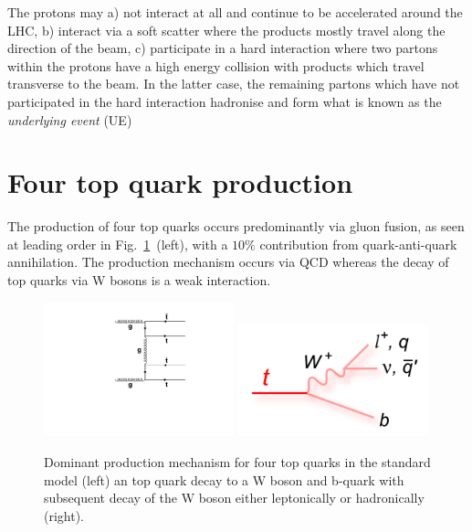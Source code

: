 The protons may a) not interact at all and continue to be accelerated around the LHC, b) interact via a soft scatter where the products mostly travel along the direction of the beam, c) participate in a hard interaction where two partons within the protons have a high energy collision with products which travel transverse to the beam. In the latter case, the remaining partons which have not participated in the hard interaction hadronise and form what is known as the \emph{underlying event} (UE)


\section{Four top quark production}

The production of four top quarks occurs predominantly via gluon fusion, as seen at leading order in Fig.~\ref{fig:ttttAtLO}~(left), with a $10\%$ contribution from quark-anti-quark annihilation. The production mechanism occurs via QCD whereas the decay of top quarks via W bosons is a weak interaction. 

\begin{figure}[ht!]
\begin{center}
    \includegraphics[width=0.49\textwidth]{images/Theory/tttt_t_LO.pdf}
    \includegraphics[width=0.49\textwidth]{images/Theory/topdecay.png}
    \caption{Dominant production mechanism for four top quarks in the standard model (left) an top quark decay to a W boson and b-quark with subsequent decay of the W boson either leptonically or hadronically (right).}
    \label{fig:ttttAtLO}
\end{center}
\end{figure}

